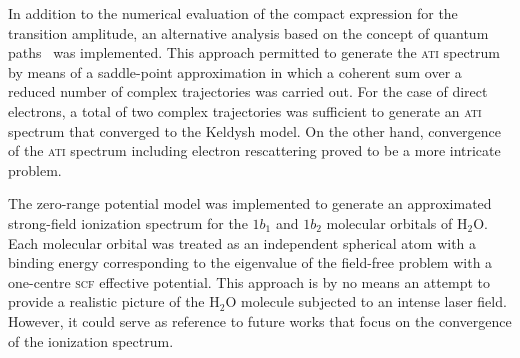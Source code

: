 In addition to the numerical evaluation of the compact expression for
the transition amplitude, an alternative analysis based on the concept
of quantum paths~\cite{KopoldOptComm2000} was implemented. This
approach permitted to generate the \textsc{ati} spectrum by means of a
saddle-point approximation in which a coherent sum over a reduced
number of complex trajectories was carried out. For the case of direct
electrons, a total of two complex trajectories was sufficient to
generate an \textsc{ati} spectrum that converged to the Keldysh
model. On the other hand, convergence of the \textsc{ati} spectrum
including electron rescattering proved to be a more intricate problem.


The zero-range potential model was implemented to generate an
approximated strong-field ionization spectrum for the $1b_{1}$ and
$1b_{2}$ molecular orbitals of H$_{2}$O. Each molecular orbital was
treated as an independent spherical atom with a binding energy
corresponding to the eigenvalue of the field-free problem with a
one-centre \textsc{scf} effective potential. This approach is by no
means an attempt to provide a realistic picture of the H$_{2}$O
molecule subjected to an intense laser field. However, it could serve
as reference to future works that focus on the convergence of the
ionization spectrum.































































